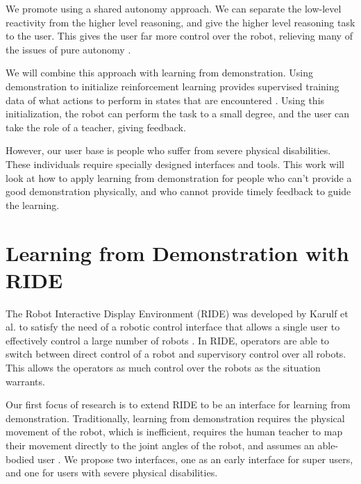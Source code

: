 \documentclass{sigchi}
\begin{document}

We promote using a shared autonomy approach. We can separate the low-level reactivity from the higher level reasoning, and give the higher level reasoning task to the user. This gives the user far more control over the robot, relieving many of the issues of pure autonomy \cite{Goodrich:2007:HIS:1348099.1348100}.

We will combine this approach with learning from demonstration. Using demonstration to initialize reinforcement learning provides supervised training data of what actions to perform in states that are encountered \cite{Bagnell_2013_7451}. Using this initialization, the robot can perform the task to a small degree, and the user can take the role of a teacher, giving feedback.

However, our user base is people who suffer from severe physical disabilities. These individuals require specially designed interfaces and tools. This work will look at how to apply learning from demonstration for people who can't provide a good demonstration physically, and who cannot provide timely feedback to guide the learning.

\section{Learning from Demonstration with RIDE}
\label{Learning by Demonstration}
The Robot Interactive Display Environment (RIDE) was developed by Karulf et al. to satisfy the need of a robotic control interface that allows a single user to effectively control a large number of robots \cite{hri11c}. In RIDE, operators are able to switch between direct control of a robot and supervisory control over all robots. This allows the operators as much control over the robots as the situation warrants.

Our first focus of research is to extend RIDE to be an interface for learning from demonstration.  Traditionally, learning from demonstration requires the physical movement of the robot, which is inefficient, requires the human teacher to map their movement directly to the joint angles of the robot, and assumes an able-bodied user \cite{Bagnell_2013_7451}. We propose two interfaces, one as an early interface for super users, and one for users with severe physical disabilities. 
\end{document}
